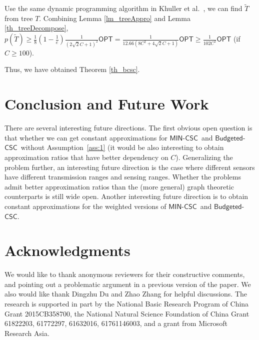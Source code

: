 \documentclass[11pt]{article}
\newcommand{\OPT}{\mathsf{OPT}}
\newcommand{\mincsc}{$\mathsf{MIN}$-$\mathsf{CSC}$}
\newcommand{\bcsc}{$\mathsf{Budgeted}$-$\mathsf{CSC}$}
\begin{document}
Use the same dynamic programming algorithm in Khuller et al.~\cite{khuller2014analyzing},
we can find $\tilde{T}$ from tree $T$.
Combining Lemma \ref{lm_treeAppro} and Lemma \ref{th_treeDecompose},
$
p(\tilde{T}) \geq \frac{1}{8} \left(1-\frac{1}{e}\right) \frac{1}{(2\sqrt{2}C + 1)^2}\OPT = \frac{1}{12.66(8C^2+4\sqrt{2}C+1)}\OPT \geq \frac{1}{102C^2}\OPT$ (if $C\geq 100$).

Thus, we have obtained Theorem \ref{th_bcsc}.



\section{Conclusion and Future Work}
There are several interesting future directions.
The first obvious open question is that whether we
can get constant approximations for \mincsc\ and \bcsc\ without Assumption~\ref{ass:1}
(it would be also interesting to obtain approximation ratios that have better dependency on $C$).
Generalizing the problem further, an interesting future direction is the case where
different sensors have different transmission ranges and sensing ranges.
Whether the problems admit better approximation ratios than the (more general) graph theoretic
counterparts is still wide open.
Another interesting future direction is to obtain constant approximations for the weighted versions of  \mincsc\ and \bcsc.

\section{Acknowledgments}

We would like to thank anonymous reviewers for their constructive comments,
and pointing out a problematic argument in a previous version of the paper.
We also would like thank Dingzhu Du and Zhao Zhang for helpful discussions.
The research is supported in part by the National Basic Research Program of China Grant 2015CB358700, 
the National Natural Science Foundation of China Grant 61822203, 61772297, 61632016, 61761146003,
and a grant from Microsoft Research Asia.




\end{document}
